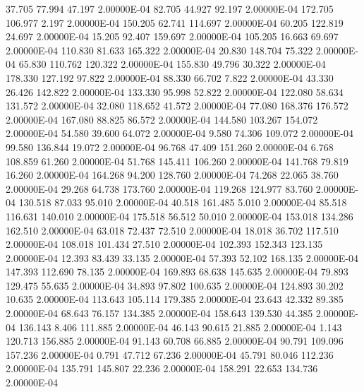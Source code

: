     37.705    77.994    47.197  2.00000E-04
    82.705    44.927    92.197  2.00000E-04
   172.705   106.977     2.197  2.00000E-04
   150.205    62.741   114.697  2.00000E-04
    60.205   122.819    24.697  2.00000E-04
    15.205    92.407   159.697  2.00000E-04
   105.205    16.663    69.697  2.00000E-04
   110.830    81.633   165.322  2.00000E-04
    20.830   148.704    75.322  2.00000E-04
    65.830   110.762   120.322  2.00000E-04
   155.830    49.796    30.322  2.00000E-04
   178.330   127.192    97.822  2.00000E-04
    88.330    66.702     7.822  2.00000E-04
    43.330    26.426   142.822  2.00000E-04
   133.330    95.998    52.822  2.00000E-04
   122.080    58.634   131.572  2.00000E-04
    32.080   118.652    41.572  2.00000E-04
    77.080   168.376   176.572  2.00000E-04
   167.080    88.825    86.572  2.00000E-04
   144.580   103.267   154.072  2.00000E-04
    54.580    39.600    64.072  2.00000E-04
     9.580    74.306   109.072  2.00000E-04
    99.580   136.844    19.072  2.00000E-04
    96.768    47.409   151.260  2.00000E-04
     6.768   108.859    61.260  2.00000E-04
    51.768   145.411   106.260  2.00000E-04
   141.768    79.819    16.260  2.00000E-04
   164.268    94.200   128.760  2.00000E-04
    74.268    22.065    38.760  2.00000E-04
    29.268    64.738   173.760  2.00000E-04
   119.268   124.977    83.760  2.00000E-04
   130.518    87.033    95.010  2.00000E-04
    40.518   161.485     5.010  2.00000E-04
    85.518   116.631   140.010  2.00000E-04
   175.518    56.512    50.010  2.00000E-04
   153.018   134.286   162.510  2.00000E-04
    63.018    72.437    72.510  2.00000E-04
    18.018    36.702   117.510  2.00000E-04
   108.018   101.434    27.510  2.00000E-04
   102.393   152.343   123.135  2.00000E-04
    12.393    83.439    33.135  2.00000E-04
    57.393    52.102   168.135  2.00000E-04
   147.393   112.690    78.135  2.00000E-04
   169.893    68.638   145.635  2.00000E-04
    79.893   129.475    55.635  2.00000E-04
    34.893    97.802   100.635  2.00000E-04
   124.893    30.202    10.635  2.00000E-04
   113.643   105.114   179.385  2.00000E-04
    23.643    42.332    89.385  2.00000E-04
    68.643    76.157   134.385  2.00000E-04
   158.643   139.530    44.385  2.00000E-04
   136.143     8.406   111.885  2.00000E-04
    46.143    90.615    21.885  2.00000E-04
     1.143   120.713   156.885  2.00000E-04
    91.143    60.708    66.885  2.00000E-04
    90.791   109.096   157.236  2.00000E-04
     0.791    47.712    67.236  2.00000E-04
    45.791    80.046   112.236  2.00000E-04
   135.791   145.807    22.236  2.00000E-04
   158.291    22.653   134.736  2.00000E-04
